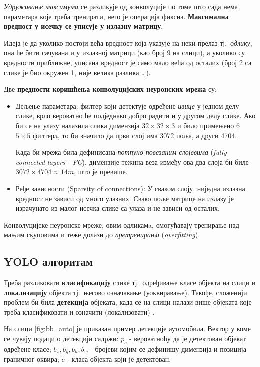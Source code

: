 \documentclass[12pt, а4paper]{article}
\begin{document}
\textit{Удруживање максимума} се разликује од конволуције по томе што сада нема
параметара које треба тренирати, него је опeрација фиксна. \textbf{Максимална
вредност у исечку се уписује у излазну матрицу}.

Идеја је да уколико постоји већа вредност која указује на неки
прелаз тј.\ \textit{одлику}, она ће бити сачувана и у излазној
матрици (као број 9 на слици), а
уколико су вредности приближне, уписана вредност је само мало већа од
осталих (број 2 са слике је био окружен 1, није велика разлика \dots).

Две \textbf{предности коришћења конволуцијских неуронских мрежа} су:
\begin{itemize}
 \item Дељење параметара: филтер који детектује одређене \textit{ивице}
 у једном делу слике, врло вероватно ће подједнако добро радити
 и у другом делу слике. Ако би се на улазу
 налазила слика димензија $32 \times 32 \times 3$ и било
 примењено 6 $5 \times 5$ филтерa, то би значило да први слој има 3072 поља, а
 други 4704.
 
 Када би мрежа била дефинисана \textit{потпуно повезаним слојевима}
 (\textit{fully connected layers - FC}), димензије тежина веза између ова два слоја
 би биле \mbox{$3072 \times 4704 \approx 14m$}, што је превише.
 \item Ређе зависности (Sparsity of connections): У сваком слоју,
 ниједна излазна вредност не зависи од много улазних. Свако поље матрице на излазу је
 израчунато из малог исечка слике са улаза и не зависи од осталих.
\end{itemize}

Конволуцијске неуронске мреже, овим одликамa, омогућавају тренирање над мањим скуповима и 
теже долази до \textit{претренирања} (\textit{overfitting}).

\subsection{YOLO алгоритам}
Треба разликовати \textbf{класификацију} слике тј.\ одређивање класе
објекта на слици и \textbf{локализацију} објекта тј.\ његово означавање
(уоквиравање). Такође, сложенији проблем би била
\textbf{детекција} објеката, када се на слици налази више објеката које треба
класификовати и означити (локализовати) \cite{ngObjLoc}.

На слици \ref{fig:bb_auto} је приказан пример детекције аутомобила. Вектор
у коме се чувају подаци о детекцији садржи: $p_c$ - вероватноћу да је детектован
објекат одређене класе; $b_x,b_y,b_h,b_w$ - бројеви којим се дефинишу
димензија и позиција граничног оквира; $c$ - класа објекта који је детектован.
\end{document}

